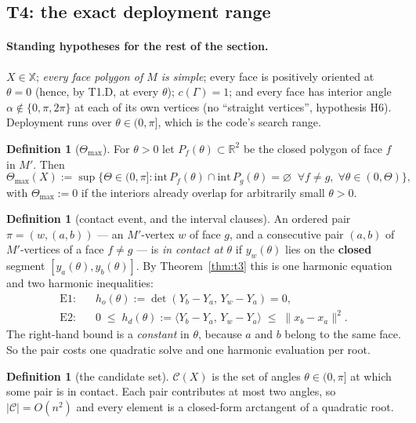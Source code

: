 \documentclass[11pt,a4paper]{article}
\theoremstyle{definition}
\newtheorem{definition}[theorem]{Definition}
\newcommand{\Tmax}{\Theta_{\max}}
\newcommand{\Mprime}{M'}
\begin{document}
\subsection{T4: the exact deployment range}

\paragraph{Standing hypotheses for the rest of the section.} $X\in\mathbb{X}$; \emph{every
face polygon of $M$ is simple}; every face is positively oriented at $\theta=0$ (hence, by
T1.D, at every $\theta$); $c(\Gamma)=1$; and every face has interior angle
$\alpha\notin\{0,\pi,2\pi\}$ at each of its own vertices (no ``straight vertices'', hypothesis
H6). Deployment runs over $\theta\in(0,\pi]$, which is the code's search range.

\begin{definition}[$\Tmax$]
For $\theta>0$ let $P_f(\theta)\subset\mathbb{R}^2$ be the closed polygon of face $f$ in
$\Mprime$. Then
\[
\Tmax(X) := \sup\bigl\{\Theta\in(0,\pi] : \mathrm{int}\,P_f(\theta)\cap
\mathrm{int}\,P_g(\theta)=\varnothing \;\;\forall f\ne g,\;\forall\theta\in(0,\Theta)\bigr\},
\]
with $\Tmax:=0$ if the interiors already overlap for arbitrarily small $\theta>0$.
\end{definition}

\begin{definition}[contact event, and the interval clauses]
\label{def:contact}
An ordered pair $\pi=(w,(a,b))$ --- an $\Mprime$-vertex $w$ of face $g$, and a consecutive
pair $(a,b)$ of $\Mprime$-vertices of a face $f\ne g$ --- is \emph{in contact at $\theta$} if
$y_w(\theta)$ lies on the \textbf{closed} segment $[y_a(\theta),y_b(\theta)]$. By
Theorem~\ref{thm:t3} this is one harmonic equation and two harmonic inequalities:
\begin{align}
\text{E1:}\quad & h_o(\theta) := \det(Y_b-Y_a,\,Y_w-Y_a) = 0, \label{eq:E1}\\
\text{E2:}\quad & 0 \;\le\; h_d(\theta) := \langle Y_b-Y_a,\,Y_w-Y_a\rangle \;\le\; \|x_b-x_a\|^2 .
\label{eq:E2}
\end{align}
The right-hand bound is a \emph{constant} in $\theta$, because $a$ and $b$ belong to the same
face. So the pair costs one quadratic solve and one harmonic evaluation per root.
\end{definition}

\begin{definition}[the candidate set]
$\mathcal{C}(X)$ is the set of angles $\theta\in(0,\pi]$ at which some pair is in contact.
Each pair contributes at most two angles, so $|\mathcal{C}|=O(n^2)$ and every element is a
closed-form arctangent of a quadratic root.
\end{definition}
\end{document}
